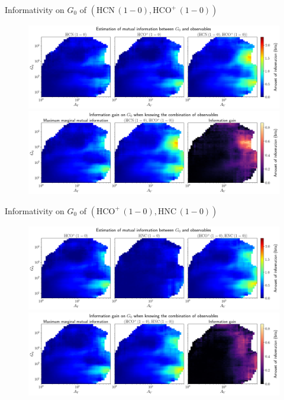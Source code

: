 \documentclass{beamer}
\begin{document}
\begin{frame}{Informativity on $G_0$ of $\left(\mathrm{HCN\,(1-0)},\mathrm{HCO^+\,(1-0)}\right)$}
    \begin{figure}
        \centering
        \includegraphics[width=0.95\linewidth]{../mi/g0__hcn10_hcop10_mi.png}
        \vfill
        \includegraphics[width=0.95\linewidth]{../mi/g0__hcn10_hcop10_mi_gain.png}
    \end{figure}
\end{frame}

\begin{frame}{Informativity on $G_0$ of $\left(\mathrm{HCO^+\,(1-0)},\mathrm{HNC\,(1-0)}\right)$}
    \begin{figure}
        \centering
        \includegraphics[width=0.95\linewidth]{../mi/g0__hcop10_hnc10_mi.png}
        \vfill
        \includegraphics[width=0.95\linewidth]{../mi/g0__hcop10_hnc10_mi_gain.png}
    \end{figure}
\end{frame}
\end{document}
